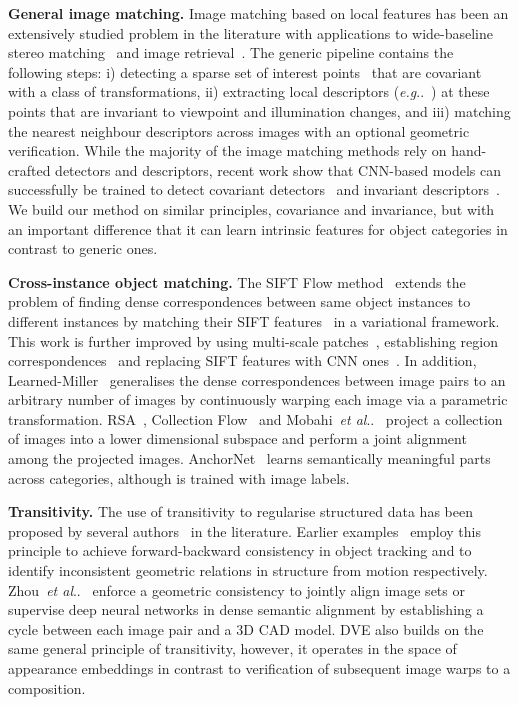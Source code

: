 \documentclass[10pt,twocolumn,letterpaper]{article}
\makeatletter
\DeclareRobustCommand\onedot{\futurelet\@let@token\@onedot}
\def\@onedot{\ifx\@let@token.\else.\null\fi\xspace}
\def\eg{\emph{e.g}\onedot} \def\Eg{\emph{E.g}\onedot}
\def\etal{\emph{et al}\onedot}
\makeatother
\begin{document}
\noindent \textbf{General image matching.} Image matching based on local features has been an extensively studied problem in the literature with applications to wide-baseline stereo matching~\cite{pritchett1998wide} and image retrieval~\cite{tuytelaars1999matching}.
The generic pipeline contains the following steps:
i) detecting a sparse set of interest points~\cite{mikolajczyk2005comparison} that are covariant with a class of transformations,
ii) extracting local descriptors (\eg~\cite{lowe2004distinctive,tola2008fast}) at these points that are invariant to viewpoint and illumination changes, and
iii) matching the nearest neighbour descriptors across images with an optional geometric verification.
While the majority of the image matching methods rely on hand-crafted detectors and descriptors, recent work show that CNN-based models can successfully be trained to detect covariant detectors~\cite{lenc16learning} and invariant descriptors~\cite{zagoruyko2015learning,paulin2015local}.
We build our method on similar principles, covariance and invariance, but with an important difference that it can learn intrinsic features for object categories in contrast to generic ones.


\noindent \textbf{Cross-instance object matching.} The SIFT Flow method~\cite{Liu2011} extends the problem of finding dense correspondences between same object instances to different instances by matching their SIFT features~\cite{lowe2004distinctive} in a variational framework.
This work is further improved by using multi-scale patches~\cite{hassner2012sifts}, establishing region correspondences~\cite{ham2016proposal} and replacing SIFT features with CNN ones~\cite{long2014convnets}.
In addition, Learned-Miller~\cite{learned2006data} generalises the dense correspondences between image pairs to an arbitrary number of images by continuously warping each image via a parametric transformation.
RSA~\cite{peng2012rasl}, Collection Flow~\cite{Kemelmacher-Shlizerman2012} and Mobahi~\etal~\cite{Mobahi2014} project a collection of images into a lower dimensional subspace and perform a joint alignment among the projected images.
AnchorNet~\cite{novotny17learning} learns semantically meaningful parts across categories, although is trained with image labels.

\noindent \textbf{Transitivity.} The use of transitivity to regularise structured data has been proposed by several authors~\cite{sundaram2010dense,zach2010disambiguating,zhou15flowweb,zhou16Blearning} in the literature.
Earlier examples~\cite{sundaram2010dense,zach2010disambiguating} employ this principle to achieve forward-backward consistency in object tracking and to identify inconsistent geometric relations in structure from motion respectively.
Zhou~\etal~\cite{zhou15flowweb,zhou16Blearning} enforce a geometric consistency to jointly align image sets or supervise deep neural networks in dense semantic alignment by establishing a cycle between each image pair and a 3D CAD model.
DVE also builds on the same general principle of transitivity, however, it operates in the space of appearance embeddings in contrast to verification of subsequent image warps to a composition.
\end{document}
